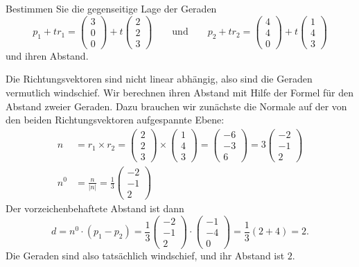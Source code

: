 Bestimmen Sie die gegenseitige Lage der Geraden
\[
p_1+tr_1
=
\begin{pmatrix} 3\\ 0\\ 0 \end{pmatrix}
+t
\begin{pmatrix} 2\\ 2\\ 3 \end{pmatrix}
\qquad
\text{und}
\qquad
p_2+tr_2
=
\begin{pmatrix} 4\\ 4\\ 0 \end{pmatrix}
+t
\begin{pmatrix} 1\\ 4\\ 3 \end{pmatrix}
\]
und ihren Abstand.


\begin{loesung}
Die Richtungsvektoren sind nicht linear abhängig, also sind
die Geraden vermutlich windschief. Wir berechnen ihren Abstand mit
Hilfe der Formel für den Abstand zweier Geraden. Dazu brauchen
wir zunächste die Normale auf der von den beiden Richtungsvektoren
aufgespannte Ebene:
\begin{align*}
n&=r_1\times r_2 =\begin{pmatrix} 2\\ 2\\ 3 \end{pmatrix}
\times
\begin{pmatrix} 1\\ 4\\ 3 \end{pmatrix}
=
\begin{pmatrix} -6\\-3\\6 \end{pmatrix}
=3
\begin{pmatrix} -2\\-1\\2 \end{pmatrix}
\\
n^0&=\frac{n}{|n|}=
\frac13
\begin{pmatrix} -2\\-1\\2 \end{pmatrix}
\end{align*}
Der vorzeichenbehaftete Abstand ist dann
\[
d=n^0\cdot(p_1-p_2)=
\frac13
\begin{pmatrix} -2\\-1\\2 \end{pmatrix}
\cdot
\begin{pmatrix} -1\\-4\\0\end{pmatrix}
=\frac13(2+4)=2.
\]
Die Geraden sind also tatsächlich windschief, und
ihr Abstand ist $2$.
\end{loesung}

